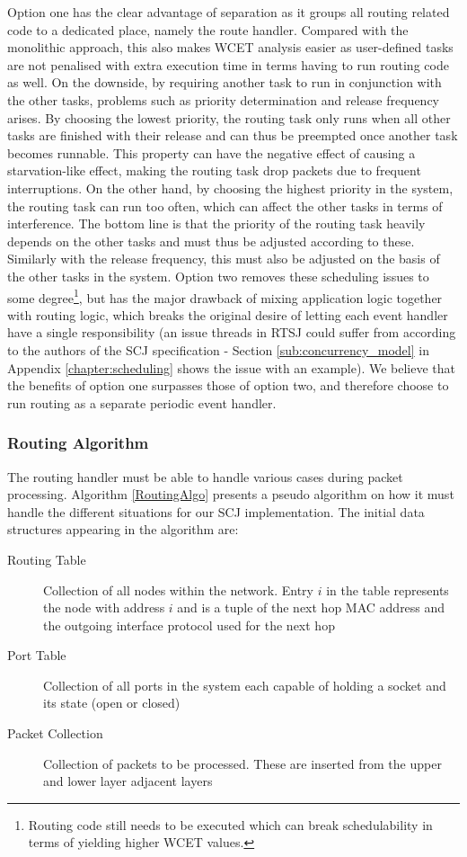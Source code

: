 Option one has the clear advantage of separation as it groups all routing related code to a dedicated place, namely the route handler. Compared with the monolithic approach, this also makes WCET analysis easier as user-defined tasks are not penalised with extra execution time in terms having to run routing code as well. On the downside, by requiring another task to run in conjunction with the other tasks, problems such as priority determination and release frequency arises. By choosing the lowest priority, the routing task only runs when all other tasks are finished with their release and can thus be preempted once another task becomes runnable. This property can have the negative effect of causing a starvation-like effect, making the routing task drop packets due to frequent interruptions. On the other hand, by choosing the highest priority in the system, the routing task can run too often, which can affect the other tasks in terms of interference. The bottom line is that the priority of the routing task heavily depends on the other tasks and must thus be adjusted according to these. Similarly with the release frequency, this must also be adjusted on the basis of the other tasks in the system. Option two removes these scheduling issues to some degree\footnote{Routing code still needs to be executed which can break schedulability in terms of yielding higher WCET values.}, but has the major drawback of mixing application logic together with routing logic, which breaks the original desire of letting each event handler have a single responsibility (an issue threads in RTSJ could suffer from according to the authors of the SCJ specification - Section \ref{sub:concurrency_model} in Appendix \ref{chapter:scheduling} shows the issue with an example). We believe that the benefits of option one surpasses those of option two, and therefore choose to run routing as a separate periodic event handler.

\subsubsection{Routing Algorithm}
The routing handler must be able to handle various cases during packet processing. Algorithm \ref{RoutingAlgo} presents a pseudo algorithm on how it must handle the different situations for our SCJ implementation. The initial data structures appearing in the algorithm are:

\begin{description}
	\item[Routing Table] Collection of all nodes within the network. Entry $i$ in the table represents the node with address $i$ and is a tuple of the next hop MAC address and the outgoing interface protocol used for the next hop 
	\item[Port Table] Collection of all ports in the system each capable of holding a socket and its state (open or closed)
	\item[Packet Collection] Collection of packets to be processed. These are inserted from the upper and lower layer adjacent layers
\end{description}

